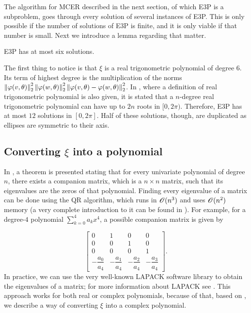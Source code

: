 The algorithm for MCER described in the next section, of which E3P is a subproblem, goes through every solution of several instances of E3P. This is only possible if the number of solutions of E3P is finite, and it is only viable if that number is small. Next we introduce a lemma regarding that matter.

\begin{lem}\label{lema:e3p}
	E3P has at most six solutions.
\end{lem}

\begin{pf}
	The first thing to notice is that $\xi$ is a real trigonometric polynomial of degree $6$. 
	Its term of highest degree is the multiplication of the norms $\left\lVert\varphi(v, \theta)\right\rVert_{2}^2\left\lVert\varphi(w, \theta)\right\rVert_{2}^2\left\lVert\varphi(v, \theta)-\varphi(w, \theta)\right\rVert_{2}^2$. In \cite[p.~150]{powell}, where a definition of real trigonometric polynomial is also given, it is stated that a $n$-degree real trigonometric polynomial can have up to $2n$ roots in $[0, 2\pi)$. Therefore, E3P has at most $12$ solutions in $[0, 2\pi]$.
	Half of these solutions, though, are duplicated as ellipses are symmetric to their axis.
\end{pf}

\subsection{Converting $\xi$ into a polynomial}

In \cite[p.~195]{horn}, a theorem is presented stating that for every univariate polynomial of degree $n$, there exists a companion matrix, which is a $n\times n$ matrix, such that its eigenvalues are the zeros of that polynomial. Finding every eigenvalue of a matrix can be done using the QR algorithm, which runs in $\mathscr{O}(n^3)$ and uses $\mathscr{O}(n^2)$ memory (a very complete introduction to it can be found in \cite{watkins:2008}). For example, for a degree-$4$ polynomial $\sum_{k=0}^4 a_k x^4$, a possible companion matrix is given by

 \begin{equation*}
\left[\begin{array}{ccccc}
0 & 1 & 0 & 0\\
0 & 0 & 1 & 0\\
0 & 0 & 0 & 1\\
-\dfrac{a_0}{a_4} & -\dfrac{a_1}{a_4} & -\dfrac{a_2}{a_4} & -\dfrac{a_3}{a_4}
\end{array}\right].
\end{equation*}
In practice, we can use the very well-known LAPACK software library to obtain the eigenvalues of a matrix; for more information about LAPACK see \cite{lapack}.
This approach works for both real or complex polynomials, because of that, based on \cite{weidner}, we describe a way of converting $\xi$ into a complex polynomial.

